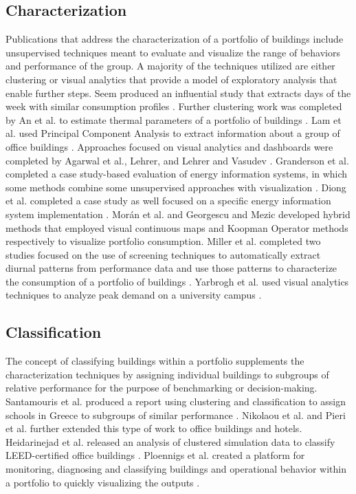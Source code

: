 \documentclass[preprint,12pt,3p]{elsarticle}
\begin{document}
\subsection{Characterization}
Publications that address the characterization of a portfolio of buildings include unsupervised techniques meant to evaluate and visualize the range of behaviors and performance of the group. A majority of the techniques utilized are either clustering or visual analytics that provide a model of exploratory analysis that enable further steps. Seem produced an influential study that extracts days of the week with similar consumption profiles \cite{seem_pattern_2005}. Further clustering work was completed by An et al. to estimate thermal parameters of a portfolio of buildings \cite{an_estimation_2012}. Lam et al. used Principal Component Analysis to extract information about a group of office buildings \cite{lam_principal_2008}. Approaches focused on visual analytics and dashboards were completed by Agarwal et al., Lehrer, and Lehrer and Vasudev \cite{agarwal_energy_2009,lehrer_research_2009,lehrer_visualizing_2011}. Granderson et al. completed a case study-based evaluation of energy information systems, in which some methods combine some unsupervised approaches with visualization \cite{granderson_building_2010}. Diong et al. completed a case study as well focused on a specific energy information system implementation  \cite{diong_establishing_2015}. Mor\'an et al. and Georgescu and Mezic developed hybrid methods that employed visual continuous maps and Koopman Operator methods respectively to visualize portfolio consumption\cite{moran_analysis_2013,georgescu_site-level_2014}. Miller et al. completed two studies focused on the use of screening techniques to automatically extract diurnal patterns from performance data and use those patterns to characterize the consumption of a portfolio of buildings  \cite{miller_forensically_2015,miller_automated_2015}. Yarbrogh et al. used visual analytics techniques to analyze peak demand on a university campus \cite{yarbrough_visualizing_2015}.

\subsection{Classification}
The concept of classifying buildings within a portfolio supplements the characterization techniques by assigning individual buildings to subgroups of relative performance for the purpose of benchmarking or decision-making. Santamouris et al. produced a report using clustering and classification to assign schools in Greece to subgroups of similar performance \cite{santamouris_using_2007}. Nikolaou et al. and Pieri et al. further extended this type of work to office buildings and hotels\cite{nikolaou_application_2012,pieri_identifying_2015}. Heidarinejad et al. released an analysis of clustered simulation data to classify LEED-certified office buildings \cite{heidarinejad_cluster_2014}. Ploennigs et al. created a platform for monitoring, diagnosing and classifying buildings and operational behavior within a portfolio to quickly visualizing the outputs \cite{ploennigs_e2-diagnoser:_2014}.
\end{document}
